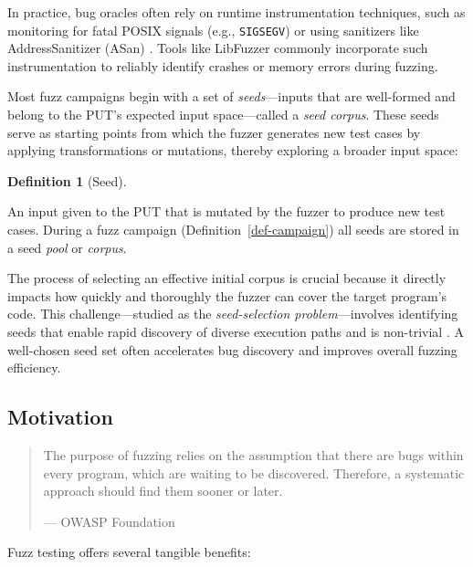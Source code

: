 \documentclass[
  a4paper,
  DIV=11,
  numbers=noendperiod]{scrreprt}
\theoremstyle{definition}
\newtheorem{definition}{Definition}[chapter]
\theoremstyle{remark}
\begin{document}
In practice, bug oracles often rely on runtime instrumentation
techniques, such as monitoring for fatal POSIX signals (e.g.,
\texttt{SIGSEGV}) or using sanitizers like AddressSanitizer (ASan)
\autocite{serebryany2012}. Tools like LibFuzzer \autocite{libfuzzer}
commonly incorporate such instrumentation to reliably identify crashes
or memory errors during fuzzing.

Most fuzz campaigns begin with a set of \emph{seeds}---inputs that are
well-formed and belong to the PUT's expected input space---called a
\emph{seed corpus}. These seeds serve as starting points from which the
fuzzer generates new test cases by applying transformations or
mutations, thereby exploring a broader input space:

\begin{definition}[Seed]\protect\hypertarget{def-seed}{}\label{def-seed}

An input given to the PUT that is mutated by the fuzzer to produce new
test cases. During a fuzz campaign (Definition~\ref{def-campaign}) all
seeds are stored in a seed \emph{pool} or \emph{corpus}.

\end{definition}

The process of selecting an effective initial corpus is crucial because
it directly impacts how quickly and thoroughly the fuzzer can cover the
target program's code. This challenge---studied as the
\emph{seed-selection problem}---involves identifying seeds that enable
rapid discovery of diverse execution paths and is non-trivial
\autocite{rebert2014}. A well-chosen seed set often accelerates bug
discovery and improves overall fuzzing efficiency.

\subsection{Motivation}\label{motivation-1}

\begin{quote}
The purpose of fuzzing relies on the assumption that there are bugs
within every program, which are waiting to be discovered. Therefore, a
systematic approach should find them sooner or later.

--- OWASP Foundation \autocite{owaspfoundation}
\end{quote}

Fuzz testing offers several tangible benefits:
\end{document}
